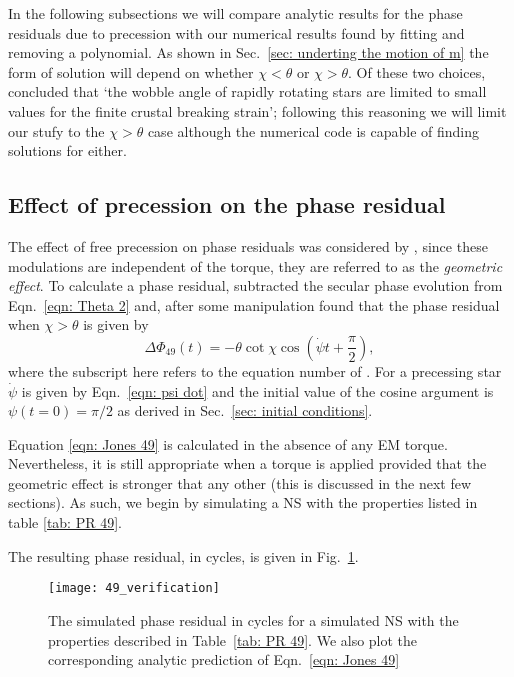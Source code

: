 \documentclass[../full_thesis/full_thesis.tex]{subfiles}
\begin{document}
In the following subsections we will compare analytic results for the phase
residuals due to precession with our numerical results found by fitting and
removing a polynomial. As shown in Sec.~\ref{sec: underting the motion of m}
the form of solution will depend on whether $\chi < \theta$ or $\chi > \theta$.
Of these two choices, \citet{Jones2001} concluded that `the wobble angle of
rapidly rotating stars are limited to small values for the finite crustal
breaking strain'; following this reasoning we will limit our stufy to the
$\chi > \theta$ case although the numerical code is capable of finding solutions
for either.

\subsection{Effect of precession on the phase residual}

The effect of free precession on phase residuals was considered by \citet{Nelson1990},
since these modulations are independent of the torque, they are referred to as
the \emph{geometric effect}. To calculate a phase residual, \citet{Jones2001}
subtracted the secular phase evolution from Eqn.~\ref{eqn: Theta 2} and,
after some manipulation found that the phase residual when $\chi > \theta$ is
given by
\begin{equation}
    \Delta\Phi_{49}(t) = -\theta \cot\chi\cos\left(\dot{\psi}t + \frac{\pi}{2}\right),
    \label{eqn: Jones 49}
\end{equation}
where the subscript here refers to the equation number of \citet{Jones2001}.
For a precessing star $\dot{\psi}$ is given by Eqn.~\eqref{eqn: psi dot} and
the initial value of the cosine argument is $\psi(t=0)=\pi/2$ as derived in
Sec.~\ref{sec: initial conditions}.

Equation \eqref{eqn: Jones 49} is calculated in the absence of any EM torque.
Nevertheless, it is still appropriate when a torque is applied provided
that the geometric effect is stronger that any other (this is discussed in
the next few sections). As such, we begin by simulating a NS with the properties
listed in table \ref{tab: PR 49}.
\begin{table}
\centering

\caption{Simulation parameters used for the phase residual plotted in Fig.~\ref{fig: PR 49}}
\label{tab: PR 49}
\end{table}
The resulting phase residual, in cycles, is
given in Fig.~\ref{fig: PR 49}.
\begin{figure}[htb]
\centering
\texttt{[image: 49\_verification]}
\caption{The simulated phase residual in cycles for a simulated NS with the
properties described in Table~\ref{tab: PR 49}. We also plot the corresponding
analytic prediction of Eqn.~\eqref{eqn: Jones 49}}
\label{fig: PR 49}
\end{figure}
\end{document}
